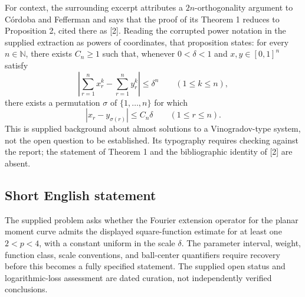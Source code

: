 \documentclass[11pt]{article}
\newcommand{\N}{\mathbb{N}}
\begin{document}
For context, the surrounding excerpt attributes a \(2n\)-orthogonality argument to C\'ordoba and Fefferman and says that the proof of its Theorem 1 reduces to Proposition 2, cited there as [2]. Reading the corrupted power notation in the supplied extraction as powers of coordinates, that proposition states: for every \(n\in\N\), there exists \(C_n\geq1\) such that, whenever \(0<\delta<1\) and \(x,y\in[0,1]^n\) satisfy
\[
\left|\sum_{r=1}^n x_r^k-\sum_{r=1}^n y_r^k\right|\leq\delta^n
\qquad(1\leq k\leq n),
\]
there exists a permutation \(\sigma\) of \(\{1,\ldots,n\}\) for which
\[
|x_r-y_{\sigma(r)}|\leq C_n\delta
\qquad(1\leq r\leq n).
\]
This is supplied background about almost solutions to a Vinogradov-type system, not the open question to be established. Its typography requires checking against the report; the statement of Theorem 1 and the bibliographic identity of [2] are absent.
\subsection{Short English statement}
The supplied problem asks whether the Fourier extension operator for the planar moment curve admits the displayed square-function estimate for at least one \(2<p<4\), with a constant uniform in the scale \(\delta\). The parameter interval, weight, function class, scale conventions, and ball-center quantifiers require recovery before this becomes a fully specified statement. The supplied open status and logarithmic-loss assessment are dated curation, not independently verified conclusions.
\end{document}
